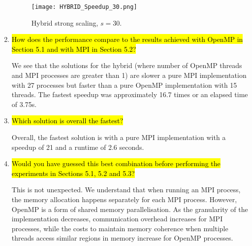 \documentclass{article}
\begin{document}
\begin{enumerate}
	\begin{figure}[p] %
	 	\begin{center}
	 		\texttt{[image: HYBRID\_Speedup\_30.png]} %
	 		\caption{Hybrid strong scaling, $s=30$.}
	 		\label{fig:hybrid_strongscaling_s30}
	 	\end{center}
	\end{figure}
	
	\item \hl{How does the performance compare to the results achieved with OpenMP in Section 5.1 and with MPI in Section 5.2?}

	We see that the solutions for the hybrid (where number of OpenMP threads and MPI processes are greater than 1) are slower a pure MPI implementation with 27 processes but faster than a pure OpenMP implementation with 15 threads. The fastest speedup was approximately 16.7 times or an elapsed time of 3.75s. 
	
	\item \hl{Which solution is overall the fastest?}

	Overall, the fastest solution is with a pure MPI implementation with a speedup of 21 and a runtime of 2.6 seconds.
	
	\item \hl{Would you have guessed this best combination before performing the experiments in Sections 5.1, 5.2 and 5.3?}

	This is not unexpected. We understand that when running an MPI process, the memory allocation happens separately for each MPI process. However, OpenMP is a form of shared memory parallelisation. As the granularity of the implementation decreases, communication overhead increases for MPI processes, while the costs to maintain memory coherence when multiple threads access similar regions in memory increase for OpenMP processes.
\end{enumerate}
\end{document}
